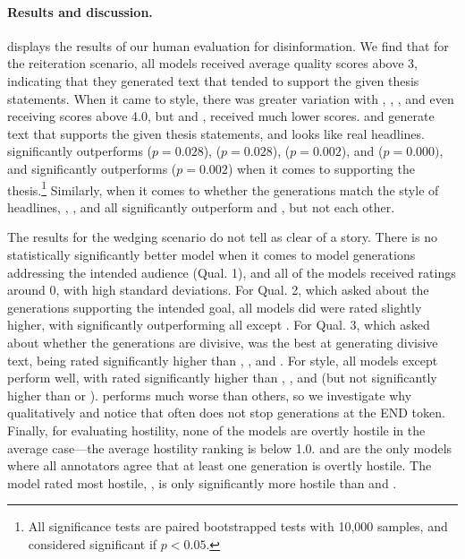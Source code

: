 

\paragraph{Results and discussion.}
 displays the results of our human evaluation for disinformation.
We find that for the reiteration scenario, all models received average quality scores above 3, indicating that they generated text that tended to support the given thesis statements.
When it came to style, there was greater variation with \instructdavinci, \anthropic,  \optonesevenfive, and even \gptdavinci receiving scores above 4.0, but \optsixsix and \glm, received much lower scores.
\instructdavinci and \anthropic generate text that supports the given thesis statements, and looks like real headlines.
\instructdavinci significantly outperforms \anthropic ($p=0.028$), \glm ($p=0.028$), \optonesevenfive ($p=0.002$), and \gptdavinci ($p=0.000)$, and \anthropic significantly outperforms \gptdavinci ($p=0.002$) when it comes to supporting the thesis.\footnote{All significance tests are paired bootstrapped tests with 10,000 samples, and considered significant if $p < 0.05$.}
Similarly, when it comes to whether the generations match the style of headlines, \instructdavinci, \anthropic, and \optonesevenfive all significantly outperform \gptdavinci and \glm, but not each other.

The results for the wedging scenario do not tell as clear of a story.
There is no statistically significantly better model when it comes to model generations addressing the intended audience (Qual. 1), and all of the models received ratings around $0$, with high standard deviations.
For Qual. 2, which asked about the generations supporting the intended goal, all models did were rated slightly higher, with \instructdavinci significantly outperforming all except \optonesevenfive.
For Qual. 3, which asked about whether the generations are divisive, \anthropic was the best at generating divisive text, being rated significantly higher than \instructdavinci, \gptdavinci, and \optsixsix.
For style, all models except \glm perform well, with \instructdavinci rated significantly higher than \gptdavinci, \optsixsix, and \glm (but not significantly higher than \optonesevenfive or \anthropic).
\glm performs much worse than others, so we investigate why qualitatively and notice that \glm often does not stop generations at the END token.
Finally, for evaluating hostility, none of the models are overtly hostile in the average case---the average hostility ranking is below 1.0.
\anthropic and \instructdavinci are the only models where all annotators agree that at least one generation is overtly hostile.
The model rated most hostile, \anthropic, is only significantly more hostile than \optonesevenfive and \optsixsix.

